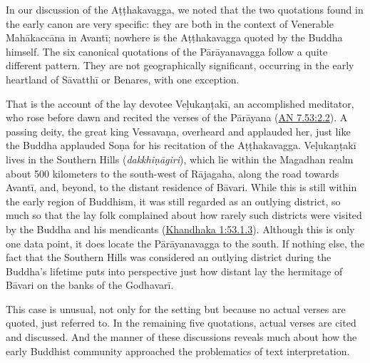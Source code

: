 \documentclass[12pt,openany]{book}%
\begin{document}
In our discussion of the \textsanskrit{Aṭṭhakavagga}, we noted that the two quotations found in the early canon are very specific: they are both in the context of Venerable \textsanskrit{Mahākaccāna} in \textsanskrit{Avantī}; nowhere is the \textsanskrit{Aṭṭhakavagga} quoted by the Buddha himself. The six canonical quotations of the \textsanskrit{Pārāyanavagga} follow a quite different pattern. They are not geographically significant, occurring in the early heartland of \textsanskrit{Sāvatthī} or Benares, with one exception.

That is the account of the lay devotee \textsanskrit{Veḷukaṇṭakī}, an accomplished meditator, who rose before dawn and recited the verses of the \textsanskrit{Pārāyana} (\href{https://suttacentral.net/an7.53/en/sujato\#2.2}{AN 7.53:2.2}). A passing deity, the great king \textsanskrit{Vessavaṇa}, overheard and applauded her, just like the Buddha applauded \textsanskrit{Soṇa} for his recitation of the \textsanskrit{Aṭṭhakavagga}. \textsanskrit{Veḷukaṇṭakī} lives in the Southern Hills (\textit{\textsanskrit{dakkhiṇāgiri}}), which lie within the Magadhan realm about 500 kilometers to the south-west of \textsanskrit{Rājagaha}, along the road towards \textsanskrit{Avantī}, and, beyond, to the distant residence of \textsanskrit{Bāvari}. While this is still within the early region of Buddhism, it was still regarded as an outlying district, so much so that the lay folk complained about how rarely such districts were visited by the Buddha and his mendicants (\href{https://suttacentral.net/pli{-}tv{-}kd1/en/brahmali\#53.1.3}{Khandhaka 1:53.1.3}). Although this is only one data point, it does locate the \textsanskrit{Pārāyanavagga} to the south. If nothing else, the fact that the Southern Hills was considered an outlying district during the Buddha’s lifetime puts into perspective just how distant lay the hermitage of \textsanskrit{Bāvari} on the banks of the \textsanskrit{Godhavarī}.

This case is unusual, not only for the setting but because no actual verses are quoted, just referred to. In the remaining five quotations, actual verses are cited and discussed. And the manner of these discussions reveals much about how the early Buddhist community approached the problematics of text interpretation.
\end{document}
